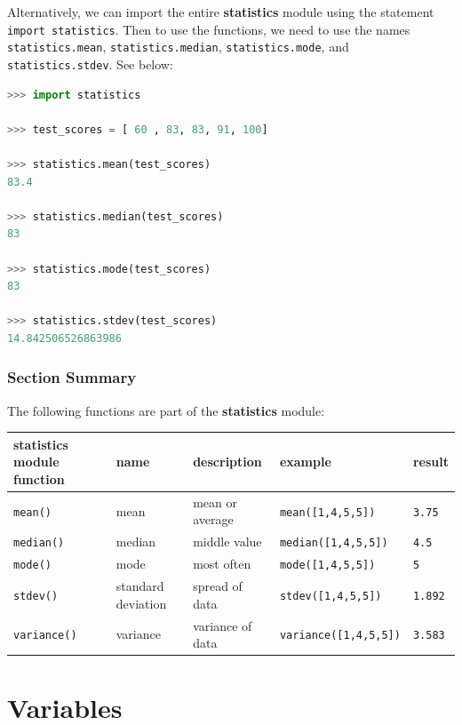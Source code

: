 \documentclass{book}
\begin{document}
Alternatively, we can import the entire \textbf{statistics} module using
the statement \lstinline!import statistics!. Then to use the functions,
we need to use the names \lstinline!statistics.mean!,
\lstinline!statistics.median!, \lstinline!statistics.mode!, and
\lstinline!statistics.stdev!. See below:

\begin{lstlisting}[language=Python]
>>> import statistics
    
>>> test_scores = [ 60 , 83, 83, 91, 100]
    
>>> statistics.mean(test_scores)
83.4

>>> statistics.median(test_scores)
83

>>> statistics.mode(test_scores)
83
    
>>> statistics.stdev(test_scores)
14.842506526863986 
\end{lstlisting}
    




    
        \subsubsection{Section Summary}\label{section-summary}

The following functions are part of the \textbf{statistics} module:

\begin{longtable}[]{@{}lllll@{}}
\toprule
statistics module function & name & description & example &
result\tabularnewline
\midrule
\endhead
\lstinline!mean()! & mean & mean or average &
\lstinline!mean([1,4,5,5])! & \lstinline!3.75!\tabularnewline
\lstinline!median()! & median & middle value &
\lstinline!median([1,4,5,5])! & \lstinline!4.5!\tabularnewline
\lstinline!mode()! & mode & most often & \lstinline!mode([1,4,5,5])! &
\lstinline!5!\tabularnewline
\lstinline!stdev()! & standard deviation & spread of data &
\lstinline!stdev([1,4,5,5])! & \lstinline!1.892!\tabularnewline
\lstinline!variance()! & variance & variance of data &
\lstinline!variance([1,4,5,5])! & \lstinline!3.583!\tabularnewline
\bottomrule
\end{longtable}
    




    
        \section{Variables}\label{variables}
    
\end{document}
